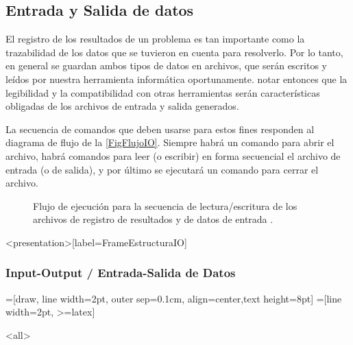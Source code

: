 \subsection{Entrada y Salida de datos}


El registro de los resultados de un problema es tan 
importante como la trazabilidad de los datos 
que se tuvieron en cuenta para resolverlo. Por lo tanto, 
en general se guardan ambos tipos de datos en archivos, 
que serán escritos y leídos por nuestra herramienta 
informática oportunamente. notar entonces que la legibilidad
y la compatibilidad con otras herramientas 
serán características obligadas de los archivos
de entrada y salida generados.

La secuencia de comandos que deben usarse para estos
fines responden al diagrama de flujo de la 
\autoref{FigFlujoIO}. Siempre habrá un comando para 
abrir el archivo, habrá comandos para leer (o 
escribir) en forma secuencial  el archivo de entrada
(o de salida), y por último se ejecutará un comando 
para cerrar el archivo.

\begin{figure}
\caption{Flujo de ejecución para la secuencia de 
lectura/escritura de los archivos de registro de resultados
y de datos de entrada \label{FigFlujoIO}.}
\end{figure}

\mode*


\begin{frame}<presentation>[label=FrameEstructuraIO]
\frametitle{Input-Output / Entrada-Salida de Datos}
=[draw, line width=2pt,
  outer sep=0.1cm, align=center,text height=8pt]
=[line width=2pt, >=latex]

\end{frame}


\mode<all>
